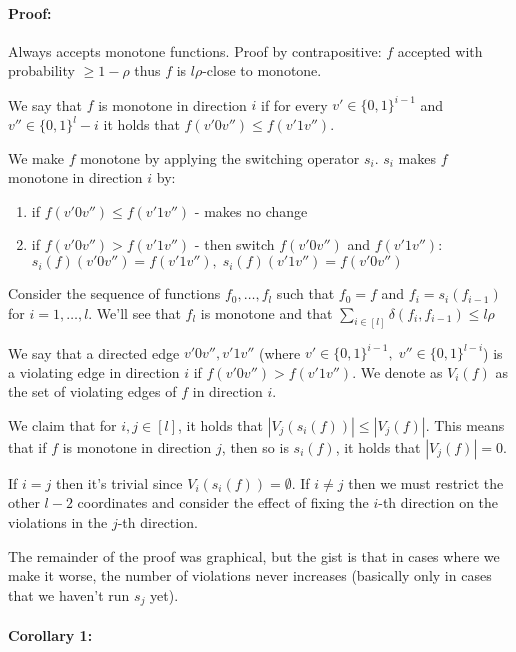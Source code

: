\documentclass{idc_msc}
\begin{document}
\paragraph{Proof:}

Always accepts monotone functions.
Proof by contrapositive: \(f\) accepted with probability \(\ge 1 - \rho\) thus \(f\) is \(l\rho\)-close to monotone.

We say that \(f\) is monotone in direction \(i\) if for every \(v' \in \{0,1\}^{i-1}\) and \(v'' \in \{0,1\}^l-i\) it holds that \(f(v' 0 v'') \le f(v' 1 v'')\).

We make \(f\) monotone by applying the switching operator \(s_i\).
\(s_i\) makes \(f\) monotone in direction \(i\) by:

\begin{enumerate}
  \item if \(f(v'0v'') \le f(v'1v'')\) - makes no change
  \item if \(f(v'0v'') > f(v'1v'')\) - then switch \(f(v'0v'')\) and \(f(v'1v'')\): \(s_i(f)(v'0v'') = f(v'1v''),\;s_i(f)(v'1v'') = f(v'0v'')\)
\end{enumerate}

Consider the sequence of functions \(f_0, \ldots, f_l\) such that \(f_0 = f\) and \(f_i = s_i(f_{i-1})\) for \(i = 1, \ldots, l\).
We'll see that \(f_l\) is monotone and that \(\sum_{i \in [l]} \delta(f_i, f_{i-1}) \le l \rho\)

We say that a directed edge \(v'0v'', v'1v''\) (where \(v' \in \{0, 1\}^{i-1} ,\; v'' \in \{0,1\}^{l-i}\)) is a violating edge in direction \(i\) if \(f(v'0v'') > f(v'1v'')\).
We denote as \(V_i(f)\) as the set of violating edges of \(f\) in direction \(i\).

We claim that for \(i, j \in [l]\), it holds that \(|V_j(s_i(f))| \le |V_j(f)|\).
This means that if \(f\) is monotone in direction \(j\), then so is \(s_i(f)\), it holds that \(|V_j(f)| = 0\).

If \(i = j\) then it's trivial since \(V_i(s_i(f)) = \emptyset\).
If \(i \ne j\) then we must restrict the other \(l-2\) coordinates and consider the effect of fixing the \(i\)-th direction on the violations in the \(j\)-th direction.

The remainder of the proof was graphical, but the gist is that in cases where we make it worse, the number of violations never increases (basically only in cases that we haven't run \(s_j\) yet).

\paragraph{Corollary 1:}
\end{document}
